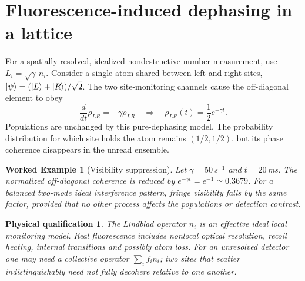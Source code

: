 \documentclass[11pt,a4paper]{article}
\newtheorem{example}{Worked Example}\newtheorem{remark}{Physical qualification}
\begin{document}
\section{Fluorescence-induced dephasing in a lattice}
For a spatially resolved, idealized nondestructive number measurement, use $L_i=\sqrt\gamma\,n_i$. Consider a single atom shared between left and right sites, $|\psi\rangle=(|L\rangle+|R\rangle)/\sqrt2$. The two site-monitoring channels cause the off-diagonal element to obey
\begin{equation}\label{eq:dephasing}
\frac{d}{dt}\rho_{LR}=-\gamma\rho_{LR}\quad\Longrightarrow\quad\rho_{LR}(t)=\frac12e^{-\gamma t}.
\end{equation}
Populations are unchanged by this pure-dephasing model. The probability distribution for which site holds the atom remains $(1/2,1/2)$, but its phase coherence disappears in the unread ensemble.
\begin{example}[Visibility suppression]
Let $\gamma=50\,$s$^{-1}$ and $t=20\,$ms. The normalized off-diagonal coherence is reduced by $e^{-\gamma t}=e^{-1}\simeq0.3679$. For a balanced two-mode ideal interference pattern, fringe visibility falls by the same factor, provided that no other process affects the populations or detection contrast.
\end{example}
\begin{remark}
The Lindblad operator $n_i$ is an effective ideal local monitoring model. Real fluorescence includes nonlocal optical resolution, recoil heating, internal transitions and possibly atom loss. For an unresolved detector one may need a collective operator $\sum_i f_i n_i$; two sites that scatter indistinguishably need not fully decohere relative to one another.
\end{remark}
\end{document}
